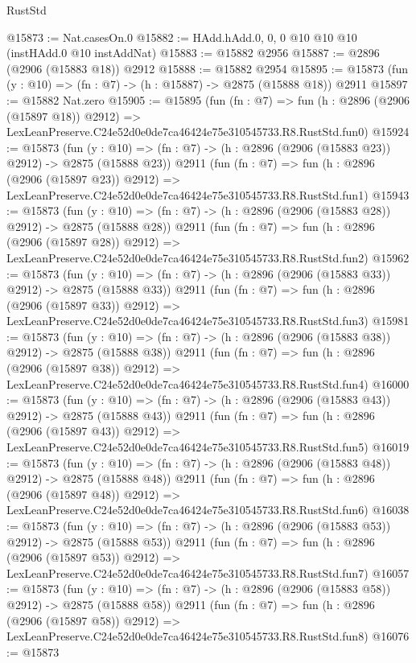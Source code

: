 \begin{lexlean}{RustStd}
\begin{coremodule}
@15873 := Nat.casesOn.{0}
@15882 := HAdd.hAdd.{0, 0, 0} @10 @10 @10 (instHAdd.{0} @10 instAddNat)
@15883 := @15882 @2956
@15887 := @2896 (@2906 (@15883 @18)) @2912
@15888 := @15882 @2954
@15895 := @15873 (fun (y : @10) => (fn : @7) -> (h : @15887) -> @2875 (@15888 @18)) @2911
@15897 := @15882 Nat.zero
@15905 := @15895
    (fun (fn : @7) =>
    fun (h : @2896 (@2906 (@15897 @18)) @2912) =>
    LexLeanPreserve.C24e52d0e0de7ca46424e75e310545733.R8.RustStd.fun0)
@15924 := @15873
    (fun (y : @10) => (fn : @7) -> (h : @2896 (@2906 (@15883 @23)) @2912) -> @2875 (@15888 @23))
    @2911
    (fun (fn : @7) =>
    fun (h : @2896 (@2906 (@15897 @23)) @2912) =>
    LexLeanPreserve.C24e52d0e0de7ca46424e75e310545733.R8.RustStd.fun1)
@15943 := @15873
    (fun (y : @10) => (fn : @7) -> (h : @2896 (@2906 (@15883 @28)) @2912) -> @2875 (@15888 @28))
    @2911
    (fun (fn : @7) =>
    fun (h : @2896 (@2906 (@15897 @28)) @2912) =>
    LexLeanPreserve.C24e52d0e0de7ca46424e75e310545733.R8.RustStd.fun2)
@15962 := @15873
    (fun (y : @10) => (fn : @7) -> (h : @2896 (@2906 (@15883 @33)) @2912) -> @2875 (@15888 @33))
    @2911
    (fun (fn : @7) =>
    fun (h : @2896 (@2906 (@15897 @33)) @2912) =>
    LexLeanPreserve.C24e52d0e0de7ca46424e75e310545733.R8.RustStd.fun3)
@15981 := @15873
    (fun (y : @10) => (fn : @7) -> (h : @2896 (@2906 (@15883 @38)) @2912) -> @2875 (@15888 @38))
    @2911
    (fun (fn : @7) =>
    fun (h : @2896 (@2906 (@15897 @38)) @2912) =>
    LexLeanPreserve.C24e52d0e0de7ca46424e75e310545733.R8.RustStd.fun4)
@16000 := @15873
    (fun (y : @10) => (fn : @7) -> (h : @2896 (@2906 (@15883 @43)) @2912) -> @2875 (@15888 @43))
    @2911
    (fun (fn : @7) =>
    fun (h : @2896 (@2906 (@15897 @43)) @2912) =>
    LexLeanPreserve.C24e52d0e0de7ca46424e75e310545733.R8.RustStd.fun5)
@16019 := @15873
    (fun (y : @10) => (fn : @7) -> (h : @2896 (@2906 (@15883 @48)) @2912) -> @2875 (@15888 @48))
    @2911
    (fun (fn : @7) =>
    fun (h : @2896 (@2906 (@15897 @48)) @2912) =>
    LexLeanPreserve.C24e52d0e0de7ca46424e75e310545733.R8.RustStd.fun6)
@16038 := @15873
    (fun (y : @10) => (fn : @7) -> (h : @2896 (@2906 (@15883 @53)) @2912) -> @2875 (@15888 @53))
    @2911
    (fun (fn : @7) =>
    fun (h : @2896 (@2906 (@15897 @53)) @2912) =>
    LexLeanPreserve.C24e52d0e0de7ca46424e75e310545733.R8.RustStd.fun7)
@16057 := @15873
    (fun (y : @10) => (fn : @7) -> (h : @2896 (@2906 (@15883 @58)) @2912) -> @2875 (@15888 @58))
    @2911
    (fun (fn : @7) =>
    fun (h : @2896 (@2906 (@15897 @58)) @2912) =>
    LexLeanPreserve.C24e52d0e0de7ca46424e75e310545733.R8.RustStd.fun8)
@16076 := @15873

\end{coremodule}
\end{lexlean}
